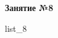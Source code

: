 \documentclass[12pt, a4paper]{article}
\begin{document}
	\begin{center}
		\large
		\textbf{Занятие №8}
	\end{center}
	{list_8}
\end{document}
